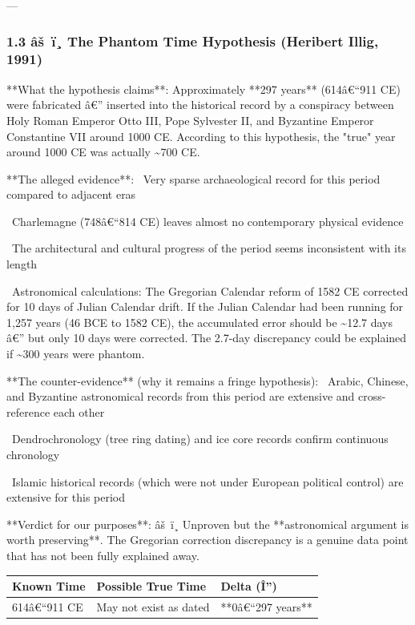 \documentclass[aps,prd,11pt,onecolumn,superscriptaddress,nofootinbib,floatfix]{revtex4-2}
\begin{document}
---


\subsubsection{1.3 âš ï¸ The Phantom Time Hypothesis (Heribert Illig, 1991)}


**What the hypothesis claims**: Approximately **297 years** (614â€``911 CE) were fabricated â€'' inserted into the historical record by a conspiracy between Holy Roman Emperor Otto III, Pope Sylvester II, and Byzantine Emperor Constantine VII around 1000 CE. According to this hypothesis, the "true" year around 1000 CE was actually \textasciitilde{}700 CE.


**The alleged evidence**:
\textbullet~Very sparse archaeological record for this period compared to adjacent eras

\textbullet~Charlemagne (748â€``814 CE) leaves almost no contemporary physical evidence

\textbullet~The architectural and cultural progress of the period seems inconsistent with its length

\textbullet~Astronomical calculations: The Gregorian Calendar reform of 1582 CE corrected for 10 days of Julian Calendar drift. If the Julian Calendar had been running for 1,257 years (46 BCE to 1582 CE), the accumulated error should be \textasciitilde{}12.7 days â€'' but only 10 days were corrected. The 2.7-day discrepancy could be explained if \textasciitilde{}300 years were phantom.



**The counter-evidence** (why it remains a fringe hypothesis):
\textbullet~Arabic, Chinese, and Byzantine astronomical records from this period are extensive and cross-reference each other

\textbullet~Dendrochronology (tree ring dating) and ice core records confirm continuous chronology

\textbullet~Islamic historical records (which were not under European political control) are extensive for this period



**Verdict for our purposes**: âš ï¸ Unproven but the **astronomical argument is worth preserving**. The Gregorian correction discrepancy is a genuine data point that has not been fully explained away.


\begin{table}[h!]
\centering
\begin{tabular}{p{3cm}p{3cm}p{3cm}}
\hline
Known Time & Possible True Time & Delta (Î'') \\
\hline
614â€``911 CE & May not exist as dated & **0â€``297 years** \\
\hline
\end{tabular}
\end{table}
\end{document}
